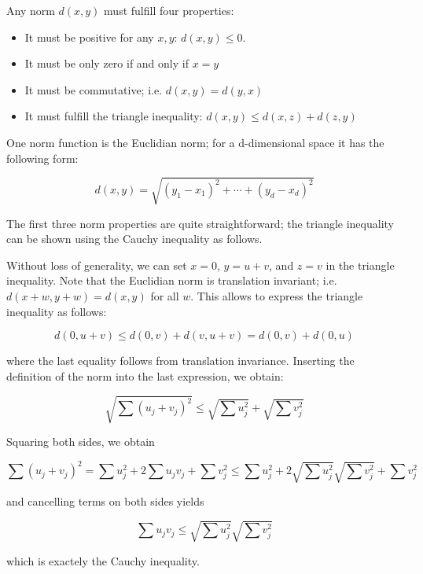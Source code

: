 
Any norm \(d(x,y)\) must fulfill four properties:

\begin{itemize}
\item
  It must be positive for any \(x,y\): \(d(x,y) \leq 0\).
\item
  It must be only zero if and only if \(x = y\)
\item
  It must be commutative; i.e. \(d(x,y) = d(y,x)\)
\item
  It must fulfill the triangle inequality:
  \(d(x,y) \leq d(x,z) + d(z, y)\)
\end{itemize}

One norm function is the Euclidian norm; for a d-dimensional space it
has the following form:

\[
d(x,y) = \sqrt{(y_1 - x_1)^2 + \cdots + (y_d - x_d)^2}
\]

The first three norm properties are quite straightforward; the triangle
inequality can be shown using the Cauchy inequality as follows.

Without loss of generality, we can set \(x = 0\), \(y = u+v\), and
\(z = v\) in the triangle inequality. Note that the Euclidian norm is
translation invariant; i.e. \(d(x+w, y+w) = d(x,y)\) for all \(w\). This
allows to express the triangle inequality as follows:

\[
d(0, u+v) \leq d(0, v) + d(v, u+v) = d(0, v) + d(0, u)
\]

where the last equality follows from translation invariance. Inserting
the definition of the norm into the last expression, we obtain:

\[
\sqrt{\sum(u_j + v_j)^2} \leq \sqrt{\sum u_j^2} + \sqrt{\sum v_j^2}
\]

Squaring both sides, we obtain

\[
\sum(u_j + v_j)^2 = \sum u_j^2 + 2 \sum u_j v_j + \sum v_j^2 \leq \sum u_j^2 + 2 \sqrt{\sum u_j^2} \sqrt{\sum v_j^2} + \sum v_j^2
\]

and cancelling terms on both sides yields

\[
\sum u_j v_j  \leq \sqrt{\sum u_j^2} \sqrt{\sum v_j^2}
\]

which is exactely the Cauchy inequality.

